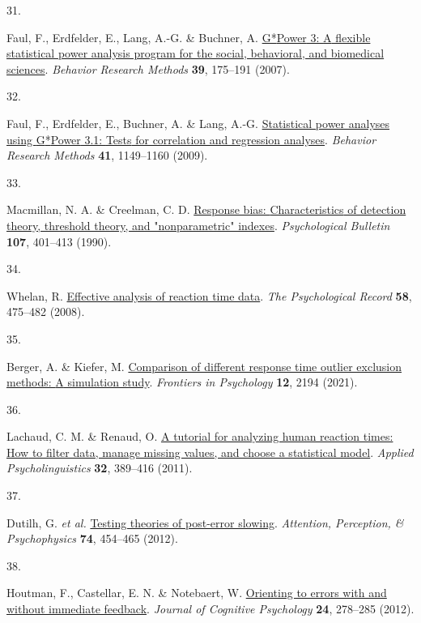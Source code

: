 \documentclass[
  man,floatsintext]{apa6}
\newlength{\cslhangindent}
\newlength{\csllabelwidth}
\newlength{\cslentryspacingunit} %
\newenvironment{CSLReferences}[2] %
 {%
  \setlength{\parindent}{0pt}
  \ifodd #1
  \let\oldpar\par
  \def\par{\hangindent=\cslhangindent\oldpar}
  \fi
  \setlength{\parskip}{#2\cslentryspacingunit}
 }%
 {}
\newcommand{\CSLLeftMargin}[1]{\parbox[t]{\csllabelwidth}{#1}}
\newcommand{\CSLRightInline}[1]{\parbox[t]{\linewidth - \csllabelwidth}{#1}\break}
\begin{document}
\begin{CSLReferences}{0}{0}
\leavevmode{}%
\CSLLeftMargin{31. }%
\CSLRightInline{Faul, F., Erdfelder, E., Lang, A.-G. \& Buchner, A. \href{https://doi.org/10.3758/BF03193146}{G*{Power} 3: {A} flexible statistical power analysis program for the social, behavioral, and biomedical sciences}. \emph{Behavior Research Methods} \textbf{39}, 175--191 (2007).}

\leavevmode{}%
\CSLLeftMargin{32. }%
\CSLRightInline{Faul, F., Erdfelder, E., Buchner, A. \& Lang, A.-G. \href{https://doi.org/10.3758/BRM.41.4.1149}{Statistical power analyses using {G}*{Power} 3.1: {Tests} for correlation and regression analyses}. \emph{Behavior Research Methods} \textbf{41}, 1149--1160 (2009).}

\leavevmode{}%
\CSLLeftMargin{33. }%
\CSLRightInline{Macmillan, N. A. \& Creelman, C. D. \href{https://doi.org/10.1037/0033-2909.107.3.401}{Response bias: {Characteristics} of detection theory, threshold theory, and "nonparametric" indexes}. \emph{Psychological Bulletin} \textbf{107}, 401--413 (1990).}

\leavevmode{}%
\CSLLeftMargin{34. }%
\CSLRightInline{Whelan, R. \href{https://doi.org/10.1007/BF03395630}{Effective analysis of reaction time data}. \emph{The Psychological Record} \textbf{58}, 475--482 (2008).}

\leavevmode{}%
\CSLLeftMargin{35. }%
\CSLRightInline{Berger, A. \& Kiefer, M. \href{https://doi.org/10.3389/fpsyg.2021.675558}{Comparison of different response time outlier exclusion methods: {A} simulation study}. \emph{Frontiers in Psychology} \textbf{12}, 2194 (2021).}

\leavevmode{}%
\CSLLeftMargin{36. }%
\CSLRightInline{Lachaud, C. M. \& Renaud, O. \href{https://doi.org/10.1017/s0142716410000457}{A tutorial for analyzing human reaction times: {How} to filter data, manage missing values, and choose a statistical model}. \emph{Applied Psycholinguistics} \textbf{32}, 389--416 (2011).}

\leavevmode{}%
\CSLLeftMargin{37. }%
\CSLRightInline{Dutilh, G. \emph{et al.} \href{https://doi.org/10.3758/s13414-011-0243-2}{Testing theories of post-error slowing}. \emph{Attention, Perception, \& Psychophysics} \textbf{74}, 454--465 (2012).}

\leavevmode{}%
\CSLLeftMargin{38. }%
\CSLRightInline{Houtman, F., Castellar, E. N. \& Notebaert, W. \href{https://doi.org/10.1080/20445911.2011.617301}{Orienting to errors with and without immediate feedback}. \emph{Journal of Cognitive Psychology} \textbf{24}, 278--285 (2012).}


\end{CSLReferences}
\end{document}
